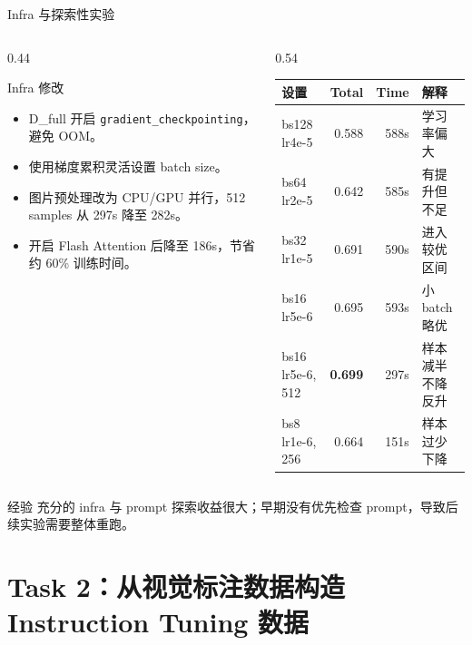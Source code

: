 \documentclass{beamer}
\newcommand{\smalltab}{\scriptsize}
\begin{document}
\begin{frame}[shrink=4]{Infra 与探索性实验}
\small
\begin{columns}[T,onlytextwidth]
\begin{column}{0.44\textwidth}
\begin{block}{Infra 修改}
\begin{itemize}
\item D\_full 开启 \texttt{gradient\_checkpointing}，避免 OOM。
\item 使用梯度累积灵活设置 batch size。
\item 图片预处理改为 CPU/GPU 并行，512 samples 从 297s 降至 282s。
\item 开启 Flash Attention 后降至 186s，节省约 60\% 训练时间。
\end{itemize}
\end{block}
\end{column}
\begin{column}{0.54\textwidth}
\smalltab
\begin{tabular}{p{}rrp{}}
\toprule
设置 & Total & Time & 解释 \\
\midrule
bs128 lr4e-5 & 0.588 & 588s & 学习率偏大 \\
bs64 lr2e-5 & 0.642 & 585s & 有提升但不足 \\
bs32 lr1e-5 & 0.691 & 590s & 进入较优区间 \\
bs16 lr5e-6 & 0.695 & 593s & 小 batch 略优 \\
bs16 lr5e-6, 512 & \textbf{0.699} & 297s & 样本减半不降反升 \\
bs8 lr1e-6, 256 & 0.664 & 151s & 样本过少下降 \\
\bottomrule
\end{tabular}
\end{column}
\end{columns}
\vspace{0.3em}
\begin{block}{经验}
充分的 infra 与 prompt 探索收益很大；早期没有优先检查 prompt，导致后续实验需要整体重跑。
\end{block}
\end{frame}

\section{Task 2：从视觉标注数据构造 Instruction Tuning 数据}
\end{document}
